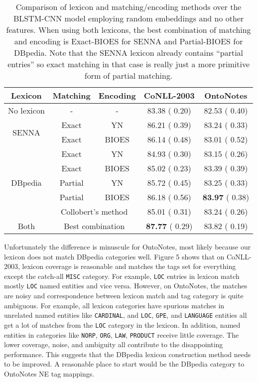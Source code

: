\documentclass[11pt,letterpaper]{article}
\begin{document}
\begin{table*}[t]
\begin{center}
\small
\begin{tabular}{|c|c|c|c|c|}
\hline \bf Lexicon & \bf Matching & \bf Encoding & \bf CoNLL-2003 & \bf OntoNotes \\ \hline
No lexicon & - & - & 83.38 ( 0.20) & 82.53 ( 0.40) \\ \hline
\multirow{2}{*}{SENNA}
 & Exact   & YN    & 86.21 ( 0.39) & 83.24 ( 0.33) \\ 
 & Exact   & BIOES & 86.14 ( 0.48) & 83.01 ( 0.52) \\ \hline
\multirow{5}{*}{DBpedia}
 & Exact   & YN    & 84.93 ( 0.30) & 83.15 ( 0.26) \\
 & Exact   & BIOES & 85.02 ( 0.23) & 83.39 ( 0.39) \\
 & Partial & YN    & 85.72 ( 0.45) & 83.25 ( 0.33) \\
 & Partial & BIOES & 86.18 ( 0.56) & {\bf 83.97} ( 0.38) \\ \cline{2-5}
 & \multicolumn{2}{|c|}{Collobert's method} & 85.01 ( 0.31) & 83.24 ( 0.26) \\ \hline
Both & \multicolumn{2}{|c|}{Best combination} & {\bf 87.77} ( 0.29) & 83.82 ( 0.19) \\
\hline
\end{tabular}
\end{center}
\caption{Comparison of lexicon and matching/encoding methods over the BLSTM-CNN model employing random embeddings and no other features. When using both lexicons, the best combination of matching and encoding is Exact-BIOES for SENNA and Partial-BIOES for DBpedia. Note that the SENNA lexicon already contains ``partial entries'' so exact matching in that case is really just a more primitive form of partial matching.}
\label{tab:lexicon-res}
\end{table*}

Unfortunately the difference is minuscule for OntoNotes, most likely because our lexicon does not match DBpedia categories well. Figure 5 shows that on CoNLL-2003, lexicon coverage is reasonable and matches the tags set for everything except the catch-all \texttt{MISC} category. For example, \texttt{LOC} entries in lexicon match mostly \texttt{LOC} named entities and vice versa. However, on OntoNotes, the matches are noisy and correspondence between lexicon match and tag category is quite ambiguous. For example, all lexicon categories have spurious matches in unrelated named entities like \texttt{CARDINAL}, and \texttt{LOC}, \texttt{GPE}, and \texttt{LANGUAGE} entities all get a lot of matches from the \texttt{LOC} category in the lexicon. In addition, named entities in categories like \texttt{NORP}, \texttt{ORG}, \texttt{LAW}, \texttt{PRODUCT} receive little coverage. The lower coverage, noise, and ambiguity all contribute to the disappointing performance. This suggests that the DBpedia lexicon construction method needs to be improved. A reasonable place to start would be the DBpedia category to OntoNotes NE tag mappings.
\end{document}
